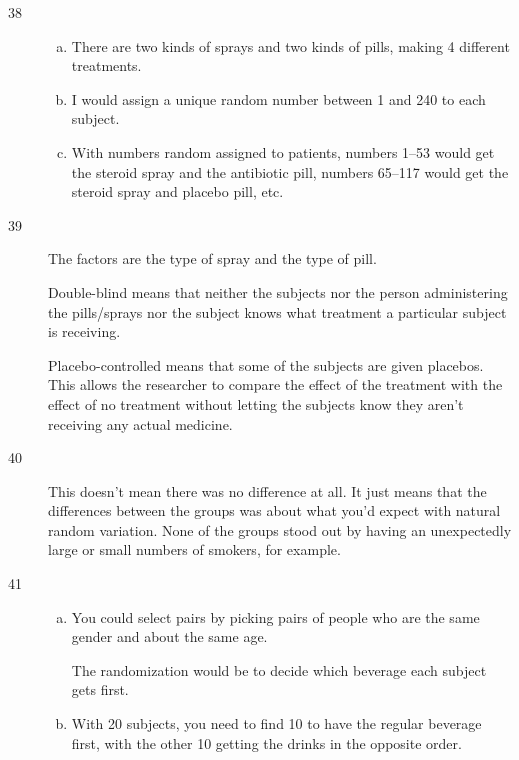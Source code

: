 \documentclass[letterpaper, landscape]{exam}
\begin{document}
\begin{description}
      \item[38]
        \begin{enumerate}[(a)]
          \item There are two kinds of sprays and two kinds of pills, making 4
            different treatments.  

          \item I would assign a unique random number between 1 and 240 to each
            subject.

          \item With numbers random assigned to patients, numbers 1--53 would
            get the steroid spray and the antibiotic pill, numbers 65--117
            would get the steroid spray and placebo pill, etc.
        \end{enumerate}

      \item[39]
        The factors are the type of spray and the type of pill.

        Double-blind means that neither the subjects nor the person
        administering the pills/sprays nor the subject knows what treatment a
        particular subject is receiving.

        Placebo-controlled means that some of the subjects are given placebos.
        This allows the researcher to compare the effect of the treatment with
        the effect of no treatment without letting the subjects know they
        aren't receiving any actual medicine.

      \item[40] This doesn't mean there was no difference at all.  It just means
        that the differences between the groups was about what you'd expect with
        natural random variation.  None of the groups stood out by having an
        unexpectedly large or small numbers of smokers, for example.

      \item[41] 
        \begin{enumerate}[(a)]
          \item You could select pairs by picking pairs of people who are the
            same gender and about the same age.  
            
            The randomization would be to decide which beverage each subject
            gets first.

          \item With 20 subjects, you need to find 10 to have the regular
            beverage first, with the other 10 getting the drinks in the opposite
            order.


\end{enumerate}
\end{description}
\end{document}
